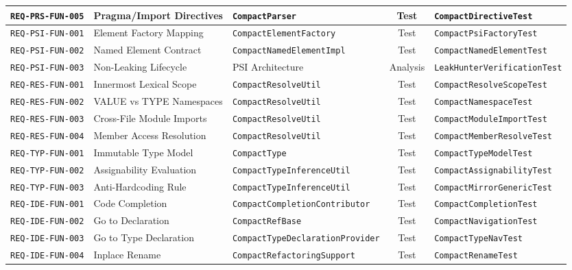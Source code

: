 \begin{table}[htbp]
\begin{tabularx}{\textwidth}{l p{3.2cm} p{3.8cm} c p{3.2cm}}
        \texttt{REQ-PRS-FUN-005} & Pragma/Import Directives & \texttt{CompactParser} & Test & \texttt{CompactDirectiveTest} \\
        \midrule
        \texttt{REQ-PSI-FUN-001} & Element Factory Mapping & \texttt{CompactElementFactory} & Test & \texttt{CompactPsiFactoryTest} \\
        \texttt{REQ-PSI-FUN-002} & Named Element Contract & \texttt{CompactNamedElementImpl} & Test & \texttt{CompactNamedElementTest} \\
        \texttt{REQ-PSI-FUN-003} & Non-Leaking Lifecycle & PSI Architecture & Analysis & \texttt{LeakHunterVerificationTest} \\
        \midrule
        \texttt{REQ-RES-FUN-001} & Innermost Lexical Scope & \texttt{CompactResolveUtil} & Test & \texttt{CompactResolveScopeTest} \\
        \texttt{REQ-RES-FUN-002} & VALUE vs TYPE Namespaces & \texttt{CompactResolveUtil} & Test & \texttt{CompactNamespaceTest} \\
        \texttt{REQ-RES-FUN-003} & Cross-File Module Imports & \texttt{CompactResolveUtil} & Test & \texttt{CompactModuleImportTest} \\
        \texttt{REQ-RES-FUN-004} & Member Access Resolution & \texttt{CompactResolveUtil} & Test & \texttt{CompactMemberResolveTest} \\
        \midrule
        \texttt{REQ-TYP-FUN-001} & Immutable Type Model & \texttt{CompactType} & Test & \texttt{CompactTypeModelTest} \\
        \texttt{REQ-TYP-FUN-002} & Assignability Evaluation & \texttt{CompactTypeInferenceUtil} & Test & \texttt{CompactAssignabilityTest} \\
        \texttt{REQ-TYP-FUN-003} & Anti-Hardcoding Rule & \texttt{CompactTypeInferenceUtil} & Test & \texttt{CompactMirrorGenericTest} \\
        \midrule
        \texttt{REQ-IDE-FUN-001} & Code Completion & \texttt{CompactCompletionContributor} & Test & \texttt{CompactCompletionTest} \\
        \texttt{REQ-IDE-FUN-002} & Go to Declaration & \texttt{CompactRefBase} & Test & \texttt{CompactNavigationTest} \\
        \texttt{REQ-IDE-FUN-003} & Go to Type Declaration & \texttt{CompactTypeDeclarationProvider} & Test & \texttt{CompactTypeNavTest} \\
        \texttt{REQ-IDE-FUN-004} & Inplace Rename & \texttt{CompactRefactoringSupport} & Test & \texttt{CompactRenameTest} \\

\end{tabularx}
\end{table}
